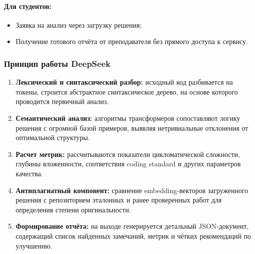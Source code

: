 \paragraph{Для студентов:}
\begin{itemize}
	\item Заявка на анализ через загрузку решения;
	\item Получение готового отчёта от преподавателя без прямого доступа к сервису.
\end{itemize}

\subsubsection{Принцип работы DeepSeek}
\begin{enumerate}
	\item \textbf{Лексический и синтаксический разбор:} исходный код разбивается на токены, строится абстрактное синтаксическое дерево, на основе которого проводится первичный анализ.
	\item \textbf{Семантический анализ:} алгоритмы трансформеров сопоставляют логику решения с огромной базой примеров, выявляя нетривиальные отклонения от оптимальной структуры.
	\item \textbf{Расчет метрик:} рассчитываются показатели цикломатической сложности, глубины вложенности, соответствия coding standard и других параметров качества.
	\item \textbf{Антиплагиатный компонент:} сравнение embedding‐векторов загруженного решения с репозиторием эталонных и ранее проверенных работ для определения степени оригинальности.
	\item \textbf{Формирование отчёта:} на выходе генерируется детальный JSON-документ, содержащий список найденных замечаний, метрик и чётких рекомендаций по улучшению.
\end{enumerate}


